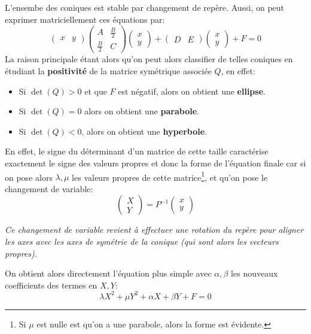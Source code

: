 \subsection*{}
L'ensembe des coniques est stable par changement de repère. Aussi, on peut exprimer matriciellement ces équations par:
\[
   \begin{pmatrix}x & y\end{pmatrix}\begin{pmatrix}
      A & \frac{B}{2} \\
      \frac{B}{2} & C
   \end{pmatrix} \begin{pmatrix}x \\ y\end{pmatrix} + \begin{pmatrix}D & E\end{pmatrix} \begin{pmatrix}x \\ y\end{pmatrix} + F = 0
\]
La raison principale étant alors qu'on peut alors classifier de telles coniques en étudiant la \textbf{positivité} de la matrice symétrique associée \(Q\), en effet:
\begin{itemize}
   \item Si \(\det({Q}) > 0\) et que \(F\) est négatif, alors on obtient une \textbf{ellipse}.
   \item Si \(\det({Q}) = 0\) alors on obtient une \textbf{parabole}.
   \item Si \(\det({Q}) < 0\), alors on obtient une \textbf{hyperbole}.
\end{itemize}

En effet, le signe du déterminant d'un matrice de cette taille caractérise exactement le signe des valeurs propres et donc la forme de l'équation finale car si on pose alors \(\lambda, \mu\) les valeurs propres de cette matrice\footnote[2]{Si \(\mu\) est nulle est qu'on a une parabole, alors la forme est évidente.}, et qu'on pose le changement de variable:
\[
   \begin{pmatrix}X \\ Y\end{pmatrix} = P^{-1} \begin{pmatrix}x \\ y\end{pmatrix}
\]
\begin{center}
   \textit{Ce changement de variable revient à effectuer une rotation du repère pour aligner les axes avec les axes de symétrie de la conique (qui sont alors les vecteurs propres).}
\end{center}
On obtient alors directement l'équation plus simple avec \(\alpha, \beta\) les nouveaux coefficients des termes en \(X, Y\):
\[
   \lambda X^2 + \mu Y^2 + \alpha X + \beta Y + F = 0 
\]

